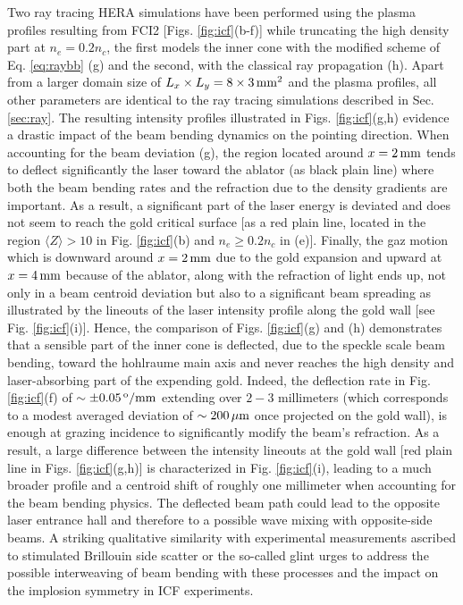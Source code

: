 \documentclass[%
 reprint,
 amsmath,amssymb,
 aps,
]{revtex4-1}
\begin{document}
Two ray tracing HERA simulations have been performed using the plasma profiles resulting from FCI2  [Figs. \ref{fig:icf}(b-f)] while truncating the high density part at $n_e=0.2n_c$, the first  models the inner cone with the modified scheme of Eq. \eqref{eq:raybb} (g) and the second, with the  classical ray propagation (h). 
Apart from a larger domain size of $L_x\times L_y = 8 \times 3 \, \rm mm^2$ and the plasma profiles, all other parameters are identical to the ray tracing simulations described in   Sec. \ref{sec:ray}.  The resulting intensity profiles illustrated in Figs. \ref{fig:icf}(g,h) evidence a drastic impact of the beam bending dynamics on the pointing direction.  When accounting for the beam deviation (g), the region located around $x=2\,\rm mm$ tends to deflect significantly the laser toward the ablator (as black plain line) where  both the beam bending rates and the refraction due to the density gradients are important. As a result, a significant part of the laser energy is deviated and does not seem to reach the gold critical surface [as a red plain line, located in the region $\langle Z \rangle>10$ in Fig. \ref{fig:icf}(b) and $n_e\ge 0.2n_c$ in (e)]. Finally, the gaz motion which is downward around $x=2\,\rm mm$ due to the gold expansion and upward at $x=4\,\rm mm$ because of the ablator, along with the refraction of light ends up, not only in a beam centroid deviation but also to a significant beam spreading as illustrated by the lineouts of the laser intensity profile along the gold wall [see  Fig. \ref{fig:icf}(i)].
Hence, the comparison of Figs. \ref{fig:icf}(g) and (h)  demonstrates that a sensible part of the inner cone is deflected, due to the speckle scale  beam bending, toward the hohlraume main axis and never reaches the high  density and laser-absorbing part of the expending gold. 
Indeed, the deflection rate in Fig. \ref{fig:icf}(f) of  $\sim \pm 0.05\,\rm ^o/mm$ extending over  $2-3$ millimeters  (which corresponds to a modest averaged deviation of $\sim 200\,\rm \mu m$ once projected on the gold wall), is enough at grazing incidence to significantly modify the beam's refraction.
As a result, a large difference between the intensity lineouts at the gold wall [red plain line in Figs. \ref{fig:icf}(g,h)] is characterized in Fig. \ref{fig:icf}(i), leading to a much broader profile  and a  centroid shift of roughly one millimeter when accounting for the beam bending physics.
The deflected beam path could lead to the opposite laser entrance hall 
and therefore to a possible wave mixing with opposite-side beams. A striking qualitative similarity with experimental measurements ascribed to stimulated Brillouin side scatter or the so-called glint \cite[]{Honda_1998,PRL_Turnbull_2015}  urges to address the possible interweaving of beam bending with these processes and the impact   on  the implosion symmetry in ICF experiments.
\end{document}

